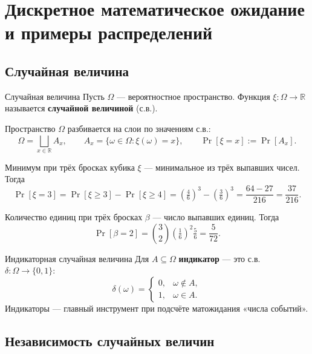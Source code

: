 
\section{Дискретное математическое ожидание и примеры распределений}

\subsection{Случайная величина}

\begin{Definition}{Случайная величина}{}
	Пусть $\Omega$ — вероятностное пространство. Функция $\xi \colon \Omega \to \mathbb{R}$ называется \textbf{случайной величиной} (с.в.).
\end{Definition}

Пространство $\Omega$ разбивается на слои по значениям с.в.:
\[
\Omega = \bigsqcup_{x \in \mathbb{R}} A_x, \qquad A_x = \{\omega \in \Omega : \xi(\omega) = x\},
\qquad
\Pr[\xi = x] := \Pr[A_x].
\]

\begin{Example}{Минимум при трёх бросках кубика}{}
	$\xi$ — минимальное из трёх выпавших чисел. Тогда
	\[
	\Pr[\xi = 3] = \Pr[\xi \ge 3] - \Pr[\xi \ge 4]
	= \left(\tfrac{4}{6}\right)^3 - \left(\tfrac{3}{6}\right)^3
	= \frac{64 - 27}{216} = \frac{37}{216}.
	\]
\end{Example}

\begin{Example}{Количество единиц при трёх бросках}{}
	$\beta$ — число выпавших единиц. Тогда
	\[
	\Pr[\beta = 2] = \binom{3}{2}\left(\tfrac{1}{6}\right)^2\tfrac{5}{6} = \frac{5}{72}.
	\]
\end{Example}

\begin{Example}{Индикаторная случайная величина}{}
	Для $A\subseteq\Omega$ \textbf{индикатор} — это с.в. $\delta\colon\Omega\to\{0,1\}$:
	\[
	\delta(\omega)=\begin{cases}0,&\omega\notin A,\\ 1,&\omega\in A.\end{cases}
	\]
	Индикаторы — главный инструмент при подсчёте матожидания «числа событий».
\end{Example}

\subsection{Независимость случайных величин}

